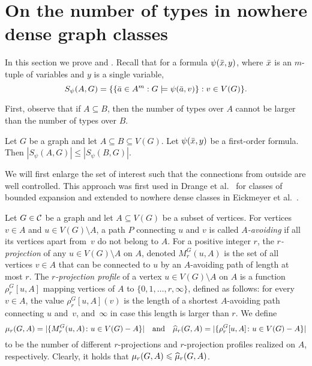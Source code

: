 \section{On the number of types in nowhere dense graph classes}

In this section we prove  and . Recall that for a
formula $\psi(\bar{x},y)$, where 
$\bar{x}$ is an $m$-tuple of variables and $y$ is a single variable, 
\[S_\psi(A,G)=\{\{\bar{a} \in A^m : G\models\psi(\bar{a},v)\} : v\in V(G)\}.\]

First, observe that if $A\subseteq B$, then the number of types
over $A$ cannot be larger than the number of types over $B$. 

\begin{lemma}\label{lem:types-over-B}
Let $G$ be a graph and let $A\subseteq B\subseteq V(G)$. Let 
$\psi(\bar{x},y)$ be a first-order formula. Then 
$|S_\psi(A,G)|\leq |S_\psi(B,G)|$. 
\end{lemma}

We will first enlarge the set of interest such 
that the connections from outside are well controlled. This approach
was first used in Drange et al.~\cite{drange2016kernelization} for
classes of bounded expansion and extended to nowhere dense
classes in Eickmeyer et al.~\cite{eickmeyer2016neighborhood}. 

Let $G\in \mathcal{C}$ be a graph and let $A\subseteq V(G)$ be a subset of vertices. For vertices $v\in A$ and $u\in V(G)\setminus A$, a path $P$ connecting $u$ and $v$ is called {\em{$A$-avoiding}}
if all its vertices apart from~$v$ do not belong to $A$. For a positive integer $r$, the {\em{$r$-projection}} of any $u\in V(G)\setminus A$ on $A$, denoted $M^G_r(u,A)$ is the set of all vertices $v\in A$ that
can be connected to $u$ by an $A$-avoiding path of length at most $r$. The {\em{$r$-projection profile}} of a vertex $u\in V(G)\setminus A$ on $A$ is a function $\rho^G_r[u,A]$ mapping vertices of
$A$ to $\{0,1,\ldots,r,\infty\}$, defined as follows: for every $v\in A$, the value $\rho^G_r[u,A](v)$ is the length of a shortest $A$-avoiding path connecting $u$ and~$v$, and~$\infty$ in case this length
is larger than $r$. We define 
\[\mu_r(G,A)=|\{M_r^G(u,A)\colon u\in V(G)- A\}|\quad\textrm{and}\quad \widehat{\mu}_r(G,A)=|\{\rho_r^G[u,A]\colon u\in V(G)- A\}|\]
to be the number of different $r$-projections and $r$-projection profiles realized on $A$, respectively. Clearly, it holds that $\mu_r(G,A)\leqslant \widehat{\mu}_r(G,A)$.

